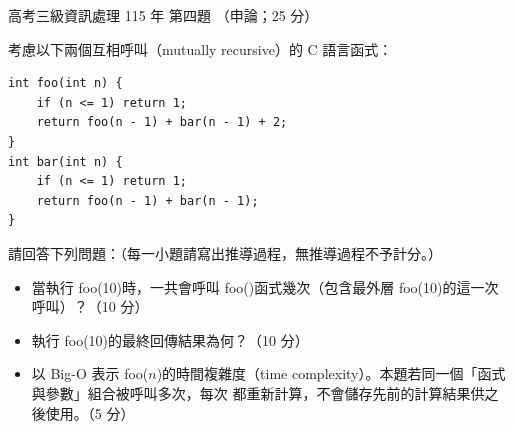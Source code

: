 \begin{pastexam}[label={px:gk3-115-ds-04}]{高考三級資訊處理 115 年 第四題}
（申論；25 分）

考慮以下兩個互相呼叫（mutually recursive）的 C 語言函式：
\begin{verbatim}
int foo(int n) {
    if (n <= 1) return 1;
    return foo(n - 1) + bar(n - 1) + 2;
}
int bar(int n) {
    if (n <= 1) return 1;
    return foo(n - 1) + bar(n - 1);
}
\end{verbatim}
請回答下列問題：（每一小題請寫出推導過程，無推導過程不予計分。）
\begin{itemize}[leftmargin=2.2em]
\item[㈠] 當執行 foo(10)時，一共會呼叫 foo()函式幾次（包含最外層 foo(10)的這一次呼叫）？（10 分）
\item[㈡] 執行 foo(10)的最終回傳結果為何？（10 分）
\item[㈢] 以 Big-O 表示 foo($n$)的時間複雜度（time complexity）。本題若同一個「函式與參數」組合被呼叫多次，每次
都重新計算，不會儲存先前的計算結果供之後使用。（5 分）
\end{itemize}
\end{pastexam}

